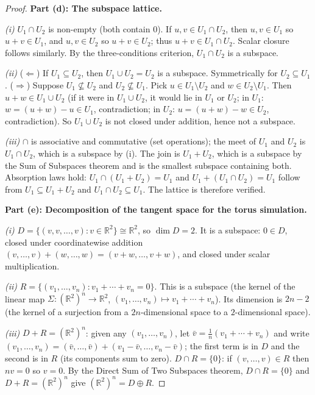 \begin{proof}
\medskip
\textbf{Part (d): The subspace lattice.}

\textit{(i)} $U_1 \cap U_2$ is non-empty (both contain $0$). If $u, v \in U_1
\cap U_2$, then $u,v \in U_1$ so $u+v \in U_1$, and $u,v \in U_2$ so
$u+v \in U_2$; thus $u+v \in U_1 \cap U_2$. Scalar closure follows
similarly. By the three-conditions criterion, $U_1 \cap U_2$ is a subspace.

\textit{(ii)} ($\Leftarrow$) If $U_1 \subseteq U_2$, then $U_1 \cup U_2 = U_2$
is a subspace. Symmetrically for $U_2 \subseteq U_1$.
($\Rightarrow$) Suppose $U_1 \not\subseteq U_2$ and $U_2 \not\subseteq U_1$.
Pick $u \in U_1 \setminus U_2$ and $w \in U_2 \setminus U_1$. Then
$u + w \in U_1 \cup U_2$ (if it were in $U_1 \cup U_2$, it would lie in $U_1$
or $U_2$; in $U_1$: $w = (u+w) - u \in U_1$, contradiction; in $U_2$:
$u = (u+w) - w \in U_2$, contradiction). So $U_1 \cup U_2$ is not closed
under addition, hence not a subspace.

\textit{(iii)} $\cap$ is associative and commutative (set operations); the
meet of $U_1$ and $U_2$ is $U_1 \cap U_2$, which is a subspace by (i). The
join is $U_1 + U_2$, which is a subspace by the Sum of Subspaces theorem and
is the smallest subspace containing both. Absorption laws hold: $U_1 \cap
(U_1 + U_2) = U_1$ and $U_1 + (U_1 \cap U_2) = U_1$ follow from $U_1
\subseteq U_1 + U_2$ and $U_1 \cap U_2 \subseteq U_1$. The lattice is
therefore verified.

\medskip
\textbf{Part (e): Decomposition of the tangent space for the torus simulation.}

\textit{(i)} $D = \{(v,v,\ldots,v) : v \in \mathbb{R}^2\} \cong \mathbb{R}^2$,
so $\dim D = 2$. It is a subspace: $0 \in D$, closed under coordinatewise
addition $(v,\ldots,v) + (w,\ldots,w) = (v+w,\ldots,v+w)$, and closed
under scalar multiplication.

\textit{(ii)} $R = \{(v_1,\ldots,v_n) : v_1+\cdots+v_n = 0\}$. This is a
subspace (the kernel of the linear map $\Sigma : (\mathbb{R}^2)^n \to
\mathbb{R}^2$, $(v_1,\ldots,v_n) \mapsto v_1+\cdots+v_n$). Its dimension
is $2n - 2$ (the kernel of a surjection from a $2n$-dimensional space to
a $2$-dimensional space).

\textit{(iii)} $D + R = (\mathbb{R}^2)^n$: given any $(v_1,\ldots,v_n)$,
let $\bar{v} = \frac{1}{n}(v_1+\cdots+v_n)$ and write $(v_1,\ldots,v_n) =
(\bar{v},\ldots,\bar{v}) + (v_1-\bar{v},\ldots,v_n-\bar{v})$; the first
term is in $D$ and the second is in $R$ (its components sum to zero).
$D \cap R = \{0\}$: if $(v,\ldots,v) \in R$ then $nv = 0$ so $v = 0$.
By the Direct Sum of Two Subspaces theorem, $D \cap R = \{0\}$ and
$D + R = (\mathbb{R}^2)^n$ give $(\mathbb{R}^2)^n = D \oplus R$.
\end{proof}

